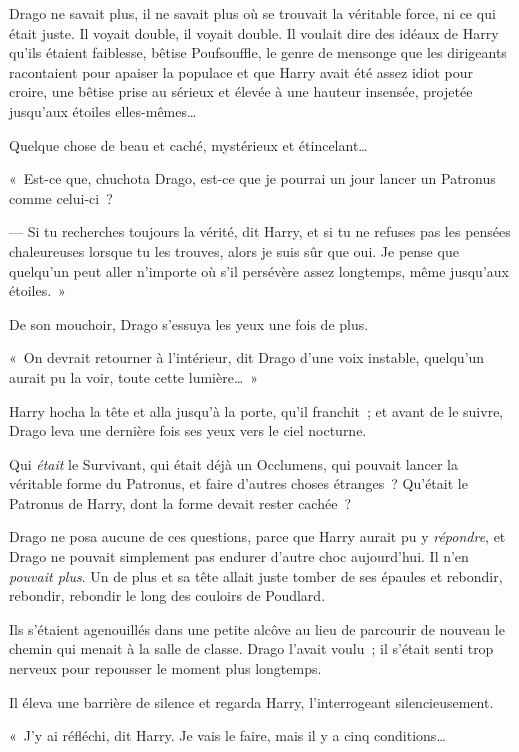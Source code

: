 Drago ne savait plus, il ne savait plus où se trouvait la véritable force, ni ce qui était juste.
Il voyait double, il voyait double.
Il voulait dire des idéaux de Harry qu'ils étaient faiblesse, bêtise Poufsouffle, le genre de mensonge que les dirigeants racontaient pour apaiser la populace et que Harry avait été assez idiot pour croire, une bêtise prise au sérieux et élevée à une hauteur insensée, projetée jusqu'aux étoiles elles-mêmes…

Quelque chose de beau et caché, mystérieux et étincelant…

«~Est-ce que, chuchota Drago, est-ce que je pourrai un jour lancer un Patronus comme celui-ci~?

--- Si tu recherches toujours la vérité, dit Harry, et si tu ne refuses pas les pensées chaleureuses lorsque tu les trouves, alors je suis sûr que oui.
Je pense que quelqu'un peut aller n'importe où s'il persévère assez longtemps, même jusqu'aux étoiles.~»

De son mouchoir, Drago s'essuya les yeux une fois de plus.

«~On devrait retourner à l'intérieur, dit Drago d'une voix instable, quelqu'un aurait pu la voir, toute cette lumière…~»

Harry hocha la tête et alla jusqu'à la porte, qu'il franchit~; et avant de le suivre, Drago leva une dernière fois ses yeux vers le ciel nocturne.

Qui \emph{était} le Survivant, qui était déjà un Occlumens, qui pouvait lancer la véritable forme du Patronus, et faire d'autres choses étranges~?
Qu'était le Patronus de Harry, dont la forme devait rester cachée~?

Drago ne posa aucune de ces questions, parce que Harry aurait pu y \emph{répondre}, et Drago ne pouvait simplement pas endurer d'autre choc aujourd'hui.
Il n'en \emph{pouvait plus}.
Un de plus et sa tête allait juste tomber de ses épaules et rebondir, rebondir, rebondir le long des couloirs de Poudlard.

\later

Ils s'étaient agenouillés dans une petite alcôve au lieu de parcourir de nouveau le chemin qui menait à la salle de classe.
Drago l'avait voulu~; il s'était senti trop nerveux pour repousser le moment plus longtemps.

Il éleva une barrière de silence et regarda Harry, l'interrogeant silencieusement.

«~J'y ai réfléchi, dit Harry.
Je vais le faire, mais il y a cinq conditions…


